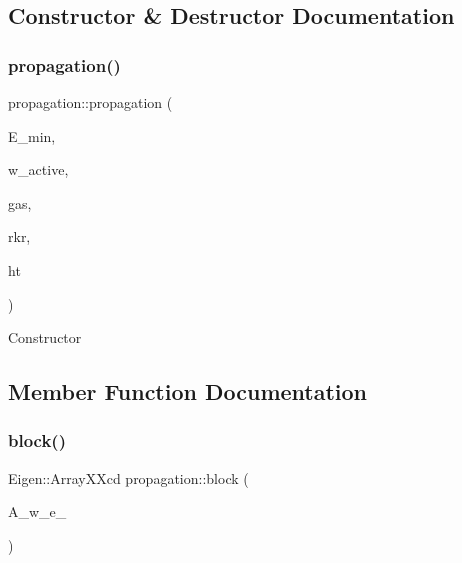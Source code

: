 \subsection{Constructor \& Destructor Documentation}
\mbox{\label{classpropagation_a2580bb2332faef03bfb6d761ee55bb6d}} 
\subsubsection{\texorpdfstring{propagation()}{propagation()}}
{\footnotesize\ttfamily propagation\+::propagation (\begin{DoxyParamCaption}\item[{double}]{E\+\_\+min,  }\item[{Eigen\+::\+Array\+Xd}]{w\+\_\+active,  }\item[{\hyperlink{classkeldysh__gas}{keldysh\+\_\+gas}}]{gas,  }\item[{\hyperlink{classgrid__rkr}{grid\+\_\+rkr}}]{rkr,  }\item[{\hyperlink{class_d_h_t}{D\+HT}}]{ht }\end{DoxyParamCaption})}

Constructor 

\subsection{Member Function Documentation}
\mbox{\label{classpropagation_af12b15d9b91f98516c0ff25efc1233d1}} 
\subsubsection{\texorpdfstring{block()}{block()}}
{\footnotesize\ttfamily Eigen\+::\+Array\+X\+Xcd propagation\+::block (\begin{DoxyParamCaption}\item[{Eigen\+::\+Array\+X\+Xcd}]{A\+\_\+w\+\_\+e\+\_\+ }\end{DoxyParamCaption})}

\mbox{\label{classpropagation_a9c2e1cb4e314c173b26de08ffcfe071d}} 
